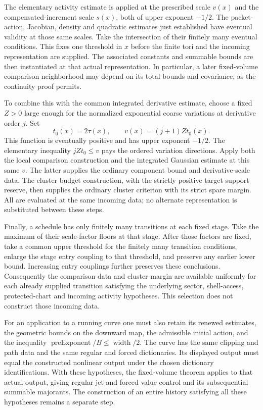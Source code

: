 The elementary activity estimate is applied at the prescribed scale
$v(x)$ and the compensated-increment scale $s(x)$, both of upper
exponent $-1/2$. The packet-action, Jacobian, density and quadratic
estimates just established have eventual validity at those same
scales. Take the intersection of their finitely many eventual
conditions. This fixes one threshold in $x$ before the finite tori
and the incoming representation are supplied. The associated
constants and summable bounds are then instantiated at that actual
representation. In particular, a later fixed-volume comparison
neighborhood may depend on its total bounds and covariance, as the
continuity proof permits.

To combine this with the common integrated derivative estimate,
choose a fixed $Z>0$ large enough for the normalized exponential
coarse variations at derivative order $j$. Set
\[
                    t_0(x)=2\tau(x),\qquad
                    v(x)=(j+1)Zt_0(x).
\]
This function is eventually positive and has upper exponent $-1/2$.
The elementary inequality $jZt_0\le v$ pays the ordered variation
directions. Apply both the local comparison construction and the
integrated Gaussian estimate at this same $v$. The latter supplies
the ordinary component bound and derivative-scale data. The cluster
budget construction, with the strictly positive target support
reserve, then supplies the ordinary cluster criterion with its
strict spare margin. All are evaluated at the same incoming data;
no alternate representation is substituted between these steps.

Finally, a schedule has only finitely many transitions at each fixed
stage. Take the maximum of their scale-factor floors at that stage.
After those factors are fixed, take a common upper threshold for the
finitely many transition conditions, enlarge the stage entry coupling
to that threshold, and preserve any earlier lower bound. Increasing
entry couplings further preserves these conclusions. Consequently the comparison data and cluster margin are available
uniformly for each already supplied transition satisfying the
underlying sector, shell-access, protected-chart and incoming activity
hypotheses. This selection does not construct those incoming data.

For an application to a running curve one must also retain its
renewed estimates, the geometric bounds on the downward map,
the admissible initial action, and the inequality
$\operatorname{preExponent}/B\le\operatorname{width}/2$.
The curve has the same clipping and path data and the same regular
and forced dictionaries. Its displayed output must equal the
constructed nonlinear output under the chosen dictionary
identifications. With these hypotheses, the fixed-volume theorem
applies to that actual output, giving regular jet and forced value
control and its subsequential summable majorants. The construction
of an entire history satisfying all these hypotheses remains a
separate step.
